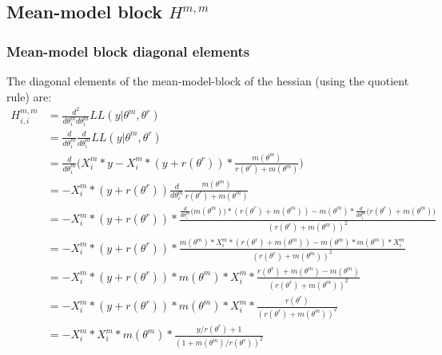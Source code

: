 \documentclass[bibliography=totoc,10pt]{scrartcl}
\begin{document}
\subsection{Mean-model block $H^{m,m}$}
\subsubsection{Mean-model block diagonal elements}
The diagonal elements of the mean-model-block of the hessian (using the quotient rule) are:
\begin{equation}
\begin{split}
H^{m,m}_{i,i} &= \frac{d^2}{d \theta^m_i d \theta^m_i} LL(y|\theta^m, \theta^r) \\
&= \frac{d}{d \theta^m_i} \frac{d}{d \theta^m_i} LL(y|\theta^m, \theta^r) \\
&= \frac{d}{d \theta^m_i} \bigg( X^m_{i}*y - X^m_{i}*(y+r(\theta^r))*\frac{m(\theta^m)}{r(\theta^r)+m(\theta^m)} \bigg) \\
&= -X^m_{i}*(y+r(\theta^r)) \frac{d}{d \theta^m_i} \frac{m(\theta^m)}{r(\theta^r)+m(\theta^m)} \\
&=  -X^m_{i}*(y+r(\theta^r))* \frac{\frac{d}{d \theta^m_i} \bigg(m(\theta^m) \bigg) * (r(\theta^r)+m(\theta^m)) - m(\theta^m)* \frac{d}{d \theta^m_i} \bigg(r(\theta^r)+m(\theta^m) \bigg)}{(r(\theta^r)+m(\theta^m))^2 } \\
&=  -X^m_{i}*(y+r(\theta^r))* \frac{ m(\theta^m) * X^m_{i}  * (r(\theta^r)+m(\theta^m)) - m(\theta^m)* m(\theta^m) * X^m_{i} }{(r(\theta^r)+m(\theta^m))^2 } \\
&=  -X^m_{i}*(y+r(\theta^r))* m(\theta^m) * X^m_{i} * \frac{ r(\theta^r)+m(\theta^m) - m(\theta^m)}{(r(\theta^r)+m(\theta^m))^2 } \\
&=  -X^m_{i}*(y+r(\theta^r))* m(\theta^m) * X^m_{i} * \frac{ r(\theta^r)}{(r(\theta^r)+m(\theta^m))^2 } \\
&=  -X^m_{i}* X^m_{i} *m(\theta^m) * \frac{y/r(\theta^r) + 1}{(1+m(\theta^m)/r(\theta^r))^2 } \\
\end{split}
\end{equation}
\end{document}
